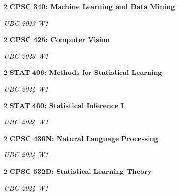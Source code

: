 \documentclass[10pt, letterpaper]{article}
\newenvironment{twocolentry}[2][]{
    \onecolentry
    \def\secondColumn{#2}
    \setcolumnwidth{\fill, 4.5 cm}
    \begin{paracol}{2}
}{
    \switchcolumn \raggedleft \secondColumn
    \end{paracol}
    \endonecolentry
} %
\begin{document}
        
        \begin{twocolentry}
            {%
            \textit{UBC 2023 W1} %
            }{%
            \textbf{CPSC 340: Machine Learning and Data Mining}  %
            }
        \end{twocolentry}


        \vspace{0.2 cm}

        \begin{twocolentry}
            {%
            \textit{UBC 2023 W1} %
            }{%
            \textbf{CPSC 425: Computer Vision}  %
            }
        \end{twocolentry}


        \vspace{0.2 cm}

        \begin{twocolentry}
            {%
            \textit{UBC 2024 W1} %
            }{%
            \textbf{STAT 406: Methods for Statistical Learning}  %
            }
        \end{twocolentry}


        \vspace{0.2 cm}

        \begin{twocolentry}
            {%
            \textit{UBC 2024 W1} %
            }{%
            \textbf{STAT 460: Statistical Inference I}  %
            }
        \end{twocolentry}


        \vspace{0.2 cm}

        \begin{twocolentry}
            {%
            \textit{UBC 2024 W1} %
            }{%
            \textbf{CPSC 436N: Natural Language Processing}  %
            }
        \end{twocolentry}


        \vspace{0.2 cm}

        \begin{twocolentry}
            {%
            \textit{UBC 2024 W1} %
            }{%
            \textbf{CPSC 532D: Statistical Learning Theory}  %
            }
        \end{twocolentry}


        \vspace{0.2 cm}
\end{document}
